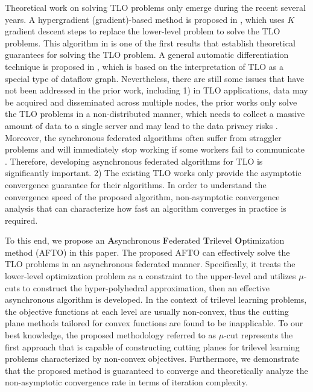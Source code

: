 \documentclass[letterpaper]{article}
\begin{document}
Theoretical work on solving TLO problems only emerge during the recent several years. A hypergradient (gradient)-based method is proposed in \cite{sato2021gradient}, which uses $K$ gradient descent steps to replace the lower-level problem to solve the TLO problems. This algorithm in \cite{sato2021gradient} is one of the first results that establish theoretical guarantees for solving the TLO problem.  A general automatic differentiation technique is proposed in \cite{choe2022betty}, which is based on the interpretation of TLO as a special type of dataflow graph.
Nevertheless, there are still some issues that have not been addressed in the prior work, including 1) in TLO applications, data may be acquired and disseminated across multiple nodes, the prior works only solve the TLO problems in a non-distributed manner, which needs to collect a massive amount of data to a single server and may lead to the data privacy risks  \cite{subramanya2021centralized,jiao2022asynchronous,han2020adaptive}. Moreover, the synchronous federated algorithms often suffer from straggler
problems and will immediately stop working if some workers fail to communicate \cite{jiao2022asynchronous}. Therefore, developing asynchronous federated algorithms for TLO is significantly important. 2) The existing TLO works only provide the asymptotic convergence guarantee for their algorithms. In order to understand the convergence speed of the proposed algorithm, non-asymptotic convergence analysis that can characterize how fast an algorithm converges in practice is required.

To this end, we propose an \textbf{A}synchronous \textbf{F}ederated \textbf{T}rilevel \textbf{O}ptimization method (AFTO) in this paper. The proposed AFTO can effectively solve the TLO problems in an asynchronous federated manner. Specifically, it treats the lower-level optimization problem as a constraint to the upper-level and utilizes $\mu$-cuts to construct the hyper-polyhedral approximation, then an effective asynchronous algorithm is developed.  In the context of trilevel learning problems, the objective functions at each level are usually non-convex, thus the cutting plane methods tailored for convex functions \cite{jiao2022asynchronous,franc2011cutting} are found to be inapplicable. To our best knowledge, the proposed methodology referred to as  $\mu$-cut represents the first approach that is capable of constructing cutting planes for trilevel learning problems characterized by non-convex objectives. Furthermore, we demonstrate that the proposed method is guaranteed to converge and theoretically analyze the non-asymptotic convergence rate in terms of iteration complexity.
\end{document}
